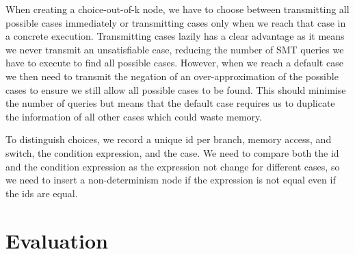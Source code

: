\documentclass[12pt,twoside]{report}
\begin{document}
When creating a choice-out-of-k node, we have to choose between transmitting all possible cases immediately or transmitting cases only when we reach that case in a concrete execution. Transmitting cases lazily has a clear advantage as it means we never transmit an unsatisfiable case, reducing the number of SMT queries we have to execute to find all possible cases. However, when we reach a default case we then need to transmit the negation of an over-approximation of the possible cases to ensure we still allow all possible cases to be found. This should minimise the number of queries but means that the default case requires us to duplicate the information of all other cases which could waste memory.

To distinguish choices, we record a unique id per branch, memory access, and switch, the condition expression, and the case. We need to compare both the id and the condition expression as the expression not change for different cases, so we need to insert a non-determinism node if the expression is not equal even if the ids are equal.


\chapter{Evaluation}


\end{document}
